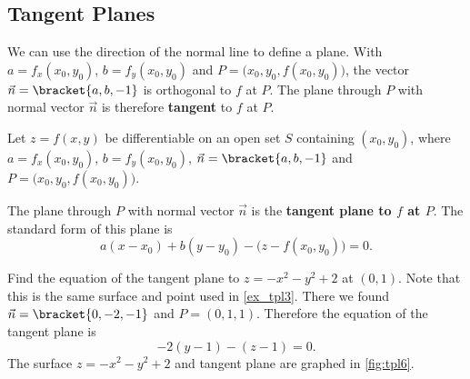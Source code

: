 \subsection{Tangent Planes}

We can use the direction of the normal line to define a plane. With $a=f_x(x_0,y_0)$, $b=f_y(x_0,y_0)$ and $P = \bigl(x_0,y_0,f(x_0,y_0)\bigr)$, the vector $\vec n=\bracket{a,b,-1}$ is orthogonal to $f$ at $P$. The plane through $P$ with normal vector $\vec n$ is therefore \textbf{tangent} to $f$ at $P$.

\begin{definition}\label{def:tangent_plane}
Let $z=f(x,y)$ be differentiable on an open set $S$ containing $(x_0,y_0)$, where
$a = f_x(x_0,y_0)$, $b=f_y(x_0,y_0)$, $\vec n=\bracket{a,b,-1}$ and $P=\bigl(x_0,y_0,f(x_0,y_0)\bigr)$.\bigskip

The plane through $P$ with normal vector $\vec n$ is the \textbf{tangent plane to $f$ at $P$}. The standard form of this plane is 
\[a(x-x_0) + b(y-y_0) - \bigl(z-f(x_0,y_0)\bigr) = 0.\]
\end{definition}

\begin{example}\label{ex_tpl6}
Find the equation of the tangent plane to $z=-x^2-y^2+2$ at $(0,1)$.
\solution
Note that this is the same surface and point used in \autoref{ex_tpl3}.
%
%
There we found $\vec n =\bracket{0,-2,-1}$ and $P = (0,1,1)$. Therefore the equation of the tangent plane is
\[-2(y-1)-(z-1)=0.\]
The surface $z=-x^2-y^2+2$ and tangent plane are graphed in \autoref{fig:tpl6}.
\end{example}

